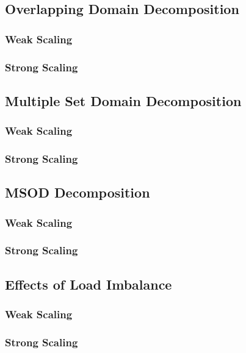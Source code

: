 \subsection{Overlapping Domain Decomposition}
\label{subsec:overlapping_domain_decomp}

\subsubsection{Weak Scaling}
\label{subsubsec:overlapping_weak}

\subsubsection{Strong Scaling}
\label{subsubsec:overlapping_strong}

\subsection{Multiple Set Domain Decomposition}
\label{subsec:multiple_set_decomposition}

\subsubsection{Weak Scaling}
\label{subsubsec:multiple_set_weak}

\subsubsection{Strong Scaling}
\label{subsubsec:multiple_set_strong}

\subsection{MSOD Decomposition}
\label{subsec:msod_decomposition}

\subsubsection{Weak Scaling}
\label{subsubsec:msod_weak}

\subsubsection{Strong Scaling}
\label{subsubsec:msod_strong}

\subsection{Effects of Load Imbalance}
\label{subsec:msod_load_imbalance}

\subsubsection{Weak Scaling}
\label{subsubsec:load_imbalance_weak}

\subsubsection{Strong Scaling}
\label{subsubsec:load_imbalance_strong}
